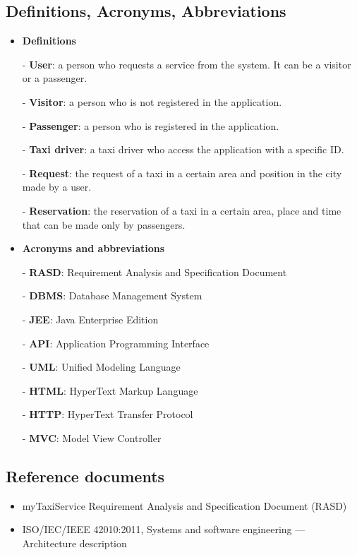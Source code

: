 	\subsection{Definitions, Acronyms, Abbreviations}
		\begin{itemize}
			\item \textbf{Definitions}
				\item[-] \textbf{User}: a person who requests a service from the system. It can be a visitor or a passenger.
				\item[-] \textbf{Visitor}: a person who is not registered in the application.
				\item[-] \textbf{Passenger}: a person who is registered in the application.
				\item[-] \textbf{Taxi driver}: a taxi driver who access the application with a specific ID.
				\item[-] \textbf{Request}: the request of a taxi in a certain area and position in the city made by a user.
				\item[-] \textbf{Reservation}: the reservation of a taxi in a certain area, place and time that can be made only by passengers.
	\newpage
			\item \textbf{Acronyms and abbreviations}
				\item[-] \textbf{RASD}: Requirement Analysis and Specification Document
				\item[-] \textbf{DBMS}: Database Management System
				\item[-] \textbf{JEE}: Java Enterprise Edition
				\item[-] \textbf{API}: Application Programming Interface
				\item[-] \textbf{UML}: Unified Modeling Language
				\item[-] \textbf{HTML}: HyperText Markup Language
				\item[-] \textbf{HTTP}: HyperText Transfer Protocol
				\item[-] \textbf{MVC}: Model View Controller
			
		\end{itemize}
	\subsection{Reference documents}
		\begin{itemize}
			\item myTaxiService Requirement Analysis and Specification Document (RASD)
			\item  ISO/IEC/IEEE 42010:2011, Systems and software engineering — Architecture description
		\end{itemize}
